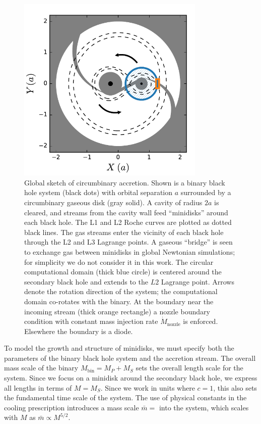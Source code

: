 \begin{figure}
\begin{center}
\includegraphics[width=0.8\textwidth]{figures/minidisk/domain.pdf}
\end{center}
\caption{ Global sketch of circumbinary accretion.  Shown is a binary black hole system (black dots) with orbital separation $a$ surrounded by a circumbinary gaseous disk (gray solid).  A cavity of radius $2a$ is cleared, and streams from the cavity wall feed ``minidisks'' around each black hole. The L1 and L2 Roche curves are plotted as dotted black lines.  The gas streams enter the vicinity of each black hole through the L2 and L3 Lagrange points.  A gaseous ``bridge'' is seen to exchange gas between minidisks in global Newtonian simulations; for simplicity we do not consider it in this work.  The circular computational domain (thick blue circle) is centered around the secondary black hole and extends to the $L2$ Lagrange point.  Arrows denote the rotation direction of the system; the computational domain co-rotates with the binary.  At the boundary near the incoming stream (thick orange rectangle) a nozzle boundary condition with constant mass injection rate $\dot{M}_\text{nozzle}$ is enforced.  Elsewhere the boundary is a diode.} 
\end{figure}

To model the growth and structure of minidisks, we must specify both the parameters of the binary black hole system and the accretion stream.  The overall mass scale of the binary $M_\text{bin} = M_P+M_S$ sets the overall length scale for the system.  Since we focus on a minidisk around the secondary black hole, we express all lengths in terms of $M = M_S$.  Since we work in units where $c=1$, this also sets the fundamental time scale of the system. The use of physical constants in the cooling prescription  introduces a mass scale $\bar{m}=$ into the system, which scales with $M$ as $\bar{m} \propto M^{5/2}$.  


